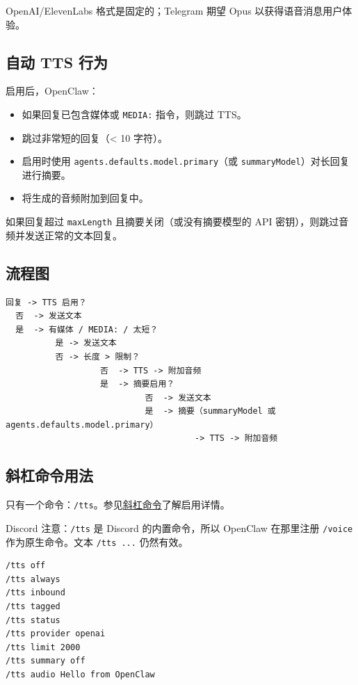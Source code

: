 OpenAI/ElevenLabs 格式是固定的；Telegram 期望 Opus 以获得语音消息用户体验。

\subsection{自动 TTS 行为}


启用后，OpenClaw：

\begin{itemize}
  \item 如果回复已包含媒体或 \texttt{MEDIA:} 指令，则跳过 TTS。
  \item 跳过非常短的回复（< 10 字符）。
  \item 启用时使用 \texttt{agents.defaults.model.primary}（或 \texttt{summaryModel}）对长回复进行摘要。
  \item 将生成的音频附加到回复中。
\end{itemize}


如果回复超过 \texttt{maxLength} 且摘要关闭（或没有摘要模型的 API 密钥），则跳过音频并发送正常的文本回复。

\subsection{流程图}


\begin{lstlisting}
回复 -> TTS 启用？
  否  -> 发送文本
  是  -> 有媒体 / MEDIA: / 太短？
          是 -> 发送文本
          否 -> 长度 > 限制？
                   否  -> TTS -> 附加音频
                   是  -> 摘要启用？
                            否  -> 发送文本
                            是  -> 摘要（summaryModel 或 agents.defaults.model.primary）
                                      -> TTS -> 附加音频
\end{lstlisting}


\subsection{斜杠命令用法}


只有一个命令：\texttt{/tts}。参见\href{/tools/slash-commands}{斜杠命令}了解启用详情。

Discord 注意：\texttt{/tts} 是 Discord 的内置命令，所以 OpenClaw 在那里注册 \texttt{/voice} 作为原生命令。文本 \texttt{/tts ...} 仍然有效。

\begin{lstlisting}
/tts off
/tts always
/tts inbound
/tts tagged
/tts status
/tts provider openai
/tts limit 2000
/tts summary off
/tts audio Hello from OpenClaw
\end{lstlisting}



